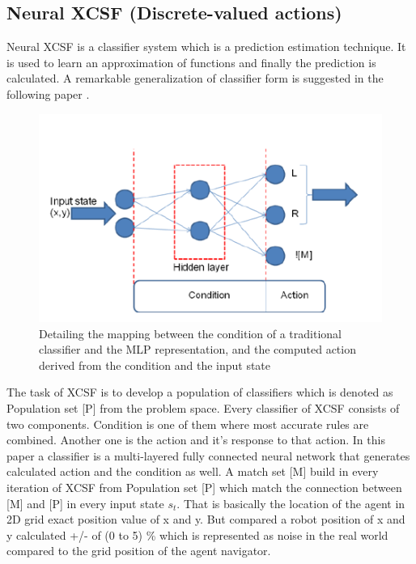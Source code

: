 \documentclass[12pt]{article}
\begin{document}
\subsection{Neural XCSF (Discrete-valued actions)}
\label{sec:2}
Neural XCSF is a classifier system which is a prediction estimation technique. It is used to learn an approximation of functions and finally the prediction is calculated. A remarkable generalization of classifier form is suggested in the following paper \cite{WilsonPrediction2001FunctionAW}.   
\begin{figure}[!htbp]
\begin{center}
\includegraphics[width=6in]{fig_2.PNG}
\end{center}
\caption{Detailing the mapping between the condition of a traditional classifier and the MLP representation, and the computed action derived from the condition and the input state \label{fig:first}}
\end{figure}
The task of XCSF is to develop a population of classifiers which is denoted as Population set [P] from the problem space. Every classifier of XCSF consists of two components. Condition is one of them where most accurate rules are combined. Another one is the action and it's response to that action. In this paper a classifier is a multi-layered fully connected neural network that generates calculated action and the condition as well. A match set [M] build in every iteration of XCSF from Population set [P] which match the connection between [M] and [P] in every input state $s_t$. That is basically the location of the agent in 2D grid exact position value of x and y. But compared a robot position of x and y calculated +/- of (0 to 5) \% which is represented as noise in the real world compared to the grid position of the agent navigator. 
\end{document}
